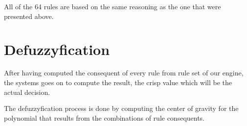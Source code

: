 \qquad All of the 64 rules are based on the same reasoning as the one that were presented above.

\section{Defuzzyfication}

\qquad After having computed the consequent of every rule from rule set of our engine, the systems goes on
to compute the result, the crisp value which will be the actual decision.

\qquad The defuzzyfication process is done by computing the center of gravity for the polynomial that results
from the combinations of rule consequents.
